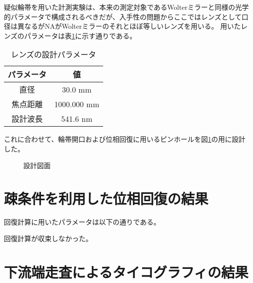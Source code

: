 疑似輪帯を用いた計測実験は、本来の測定対象であるWolterミラーと同様の光学的パラメータで構成されるべきだが、入手性の問題からここではレンズとして口径は異なるがNAがWolterミラーのそれとほぼ等しいレンズを用いる。
用いたレンズのパラメータは表\ref{tb:focusing_lens_params}に示す通りである。

\begin{table}[h]
\begin{center}
  \begin{tabular}{|c|c|} \hline
    パラメータ & 値 \\ \hline
    直径 & 30.0 mm  \\
    焦点距離 & 1000.000 mm \\
    設計波長 & 541.6 nm \\ \hline
  \end{tabular}
  \caption{レンズの設計パラメータ}
  \label{tb:focusing_lens_params}
\end{center}
\end{table}

これに合わせて、輪帯開口および位相回復に用いるピンホールを図\ref{fig:lens_pinhole_ring_aperture}の用に設計した。

\begin{figure}[!ht]
\centering

\caption[]{設計図面}
\label{fig:lens_pinhole_ring_aperture}
\end{figure}

\clearpage
\newpage


\section{疎条件を利用した位相回復の結果}
回復計算に用いたパラメータは以下の通りである。

回復計算が収束しなかった。


\clearpage
\newpage

\section{下流端走査によるタイコグラフィの結果}



